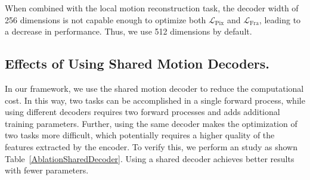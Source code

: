 \documentclass[sigconf,screen]{acmart}
\begin{document}
When combined with the local motion reconstruction task, the decoder width of 256 dimensions is not capable enough to optimize both $\mathcal{L}_{\mathrm{Pix}}$ and $\mathcal{L}_{\mathrm{Fra}}$, leading to a decrease in performance. Thus, we use 512 dimensions by default.

\begin{table}[htbp]
\normalsize
\renewcommand\arraystretch{1.1}
\setlength{\tabcolsep}{10mm}
\centering
\caption{Ablation study on the decoder width using $\mathcal{L}_{\mathrm{VV}}$, $\mathcal{L}_{\mathrm{Pix}}$, and $\mathcal{L}_{\mathrm{Fra}}$.}
\label{AblationAddiDW}
\end{table}

\begin{table}[bp]
\normalsize
\renewcommand\arraystretch{1.1}
\setlength{\tabcolsep}{8mm}
\centering
\caption{Ablation study on the shared or different motion decoder.}
\label{AblationSharedDecoder}
\end{table}

\subsection{Effects of Using Shared Motion Decoders.} 
In our framework, we use the shared motion decoder to reduce the computational cost. In this way, two tasks can be accomplished in a single forward process, while using different decoders requires two forward processes and adds additional training parameters. Further, using the same decoder makes the optimization of two tasks more difficult, which potentially requires a higher quality of the features extracted by the encoder. To verify this, we perform an study as shown Table~\ref{AblationSharedDecoder}. Using a shared decoder achieves better results with fewer parameters.
\end{document}
